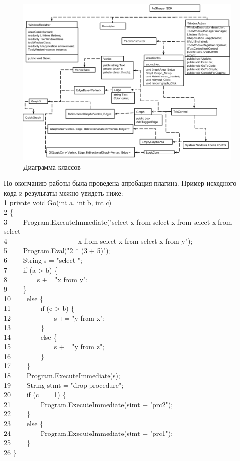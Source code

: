 \documentclass{matmex-diploma}
\begin{document}
\begin{figure}[h]
\label{Diagram}
\centering
\includegraphics[width=\textwidth]{ClassDiagram.png}
\caption{Диаграмма классов}
\end{figure}

По окончанию работы была проведена апробация плагина. Пример исходного кода и результаты можно увидеть ниже:\\
1 private void Go(int a, int b, int c)\\
2 \{\\
3 \ \ \ \ Program.ExecuteImmediate("select x from select x from select x from select\\
4 \ \ \ \ \ \ \ \ \ \ \ \ \ \ \ \ \ \ \ \ x from select x from select x from y");\\
5 \ \ \ \ Program.Eval("2 * (3 + 5)");\\
6 \ \ \ \ String s = "select ";\\
7 \ \ \ \ if (a > b) \{\\
8 \ \ \ \ \ \ \ \ s += "x from y";\\
9 \ \ \ \ \}\\
10 \ \ \ \ else \{\\
11 \ \ \ \ \ \ \ \ if (c > b) \{\\
12 \ \ \ \ \ \ \ \ \ \ \ \ s += "y from x";\\
13 \ \ \ \ \ \ \ \ \}\\
14 \ \ \ \ \ \ \ \ else \{\\
15 \ \ \ \ \ \ \ \ \ \ \ \ s += "y from z";\\
16 \ \ \ \ \ \ \ \ \}\\
17 \ \ \ \ \}\\
18 \ \ \ \ Program.ExecuteImmediate(s);\\
19 \ \ \ \ String stmt = "drop procedure";\\
20 \ \ \ \ if (c == 1) \{\\
21 \ \ \ \ \ \ \ \ Program.ExecuteImmediate(stmt + "prc2");\\
22 \ \ \ \ \}\\
23 \ \ \ \ else \{\\
24 \ \ \ \ \ \ \ \ Program.ExecuteImmediate(stmt + "prc1");\\
25 \ \ \ \ \}\\
26 \}\\
\end{document}
